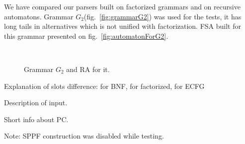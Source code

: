 \documentclass[runningheads,a4paper]{llncs}
\begin{document}
We have compared our parsers built on factorized grammars and on recursive automatons.
Grammar $G_2$(fig.~\ref{fig:grammarG2}) was used for the tests,
it has long tails in alternatives which is not unified with factorization.
FSA built for this grammar presented on fig.~\ref{fig:automatonForG2}.

\begin{figure}[H]
    \centering
    ~
    \caption{Grammar $G_2$ and RA for it.}
\end{figure}

Explanation of slots difference: for BNF, for factorized, for ECFG

Description of input. 

Short info about PC.

Note: SPPF construction was disabled while testing.
\end{document}
